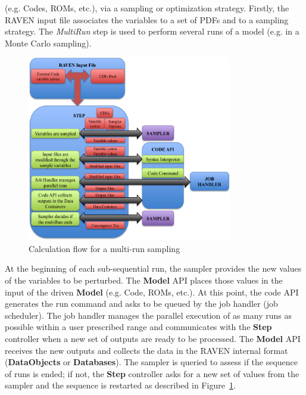 (e.g. Codes, ROMs, etc.), via a sampling or optimization strategy. 
Firstly, the RAVEN input file associates the variables to a set of PDFs and to a sampling strategy. The  \textit{MultiRun} 
step is used to perform several runs of a model (e.g. in a Monte Carlo sampling).
\begin{figure}[ht]
  \centering
  \includegraphics[width=0.8\textwidth]  {pics/MultiRunCalculationFlow.png}
  \caption{Calculation flow for a multi-run sampling}
  \label{fig:multiRun}
\end{figure}
At the beginning of each sub-sequential run, the sampler provides the new values of the variables to be perturbed. 
The \textbf{Model} API places those values in the input of the driven  \textbf{Model}  (e.g. Code, ROMs, etc.).
 At this point, the code API generates the run command and asks to be 
queued by the job handler (job scheduler). 
The job handler manages the parallel execution of as many runs as possible within a user 
prescribed range and communicates with the \textbf{Step} controller when a new set of outputs are ready to be processed. 
The \textbf{Model} API receives the new outputs and collects the data in the RAVEN internal format (\textbf{DataObjects} 
or \textbf{Databases}). The sampler is queried to assess 
if the sequence of runs is ended; if not, the  \textbf{Step}  controller asks for a new set of values 
from the sampler and the sequence 
is restarted as described in Figure~\ref{fig:multiRun}.

